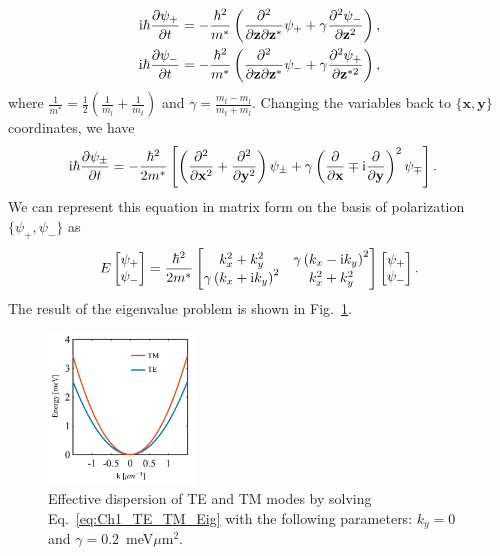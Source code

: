 %
\begin{eqnarray}
    \mathrm{i}\hbar \frac{\partial \psi_+}{\partial t} &= -\frac{\hbar^2}{m^*} \left(  \frac{\partial^2}{\partial \mathbf{z} \partial \mathbf{z}^*} \psi_+ + \gamma \frac{\partial^2 \psi_-}{\partial \mathbf{z}^2} \right),\\
    \mathrm{i}\hbar \frac{\partial \psi_-}{\partial t} &= -\frac{\hbar^2}{m^*} \left(  \frac{\partial^2}{\partial \mathbf{z} \partial \mathbf{z}^*} \psi_- + \gamma \frac{\partial^2 \psi_+}{\partial \mathbf{z}^{*2}} \right),
    \label{eq:Ch1_TE_TM_Z}
\end{eqnarray}
where $\frac{1}{m^*}= \frac{1}{2}\left(\frac{1}{m_l}+\frac{1}{m_t}\right)$ and $\gamma = \frac{m_t-m_l}{m_t+m_l}$.
Changing the variables back to $\{ \mathbf{x},\mathbf{y}\}$ coordinates, we have
%
\begin{eqnarray}
        \mathrm{i}\hbar \frac{\partial \psi_\pm}{\partial t} &= -\frac{\hbar^2}{2m^*} \left[ \left(\frac{\partial^2}{\partial \mathbf{x}^2}+ \frac{\partial^2}{\partial \mathbf{y}^2} \right) \psi_\pm + \gamma \left( \frac{\partial}{\partial \mathbf{x}} \mp \mathrm{i}\frac{\partial}{\partial \mathbf{y}}\right)^2 \psi_\mp \right].
    \label{eq:Ch1_TE_TM_XY}
\end{eqnarray}
%
We can represent this equation in matrix form on the basis of polarization $\{\psi_+,\psi_-\}$ as
%
\begin{equation}
    E
    \begin{bmatrix}
    \psi_+ \\
    \psi_-
    \end{bmatrix}
    =
    \frac{\hbar^2}{2m^*}
    \begin{bmatrix}
    k_x^2 + k_y^2 & \gamma\left( k_x -\mathrm{i} k_y\right)^2 \\
    \gamma\left( k_x +\mathrm{i} k_y\right)^2 & k_x^2 + k_y^2
    \end{bmatrix}
    \begin{bmatrix}
     \psi_+ \\
    \psi_-
    \end{bmatrix}.
    \label{eq:Ch1_TE_TM_Eig}
\end{equation}
%
The result of the eigenvalue problem is shown in Fig.~\ref{fig:Ch1_TE_TM}.

%
\begin{figure}[ht]
    \centering
    \includegraphics[width=0.35\textwidth]{Fig/Ch1/tetm.pdf}
    \caption[TE-TM Splitting]{Effective dispersion of TE and TM modes by solving Eq.~\eqref{eq:Ch1_TE_TM_Eig} with the following parameters:  $k_y = 0$ and $\gamma=0.2$~meV$\mu$m$^2$. }
    \label{fig:Ch1_TE_TM}
\end{figure}
%

